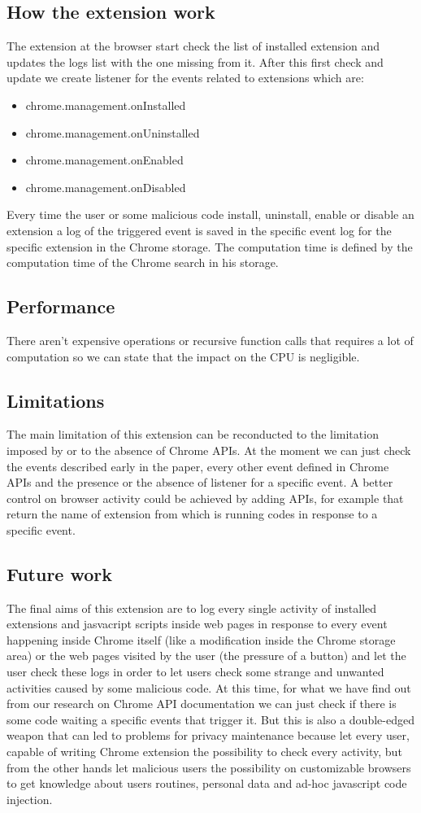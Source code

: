 \documentclass[12pt]{article}
\begin{document}
\begin{multicols}{2}
\subsection*{How the extension work}
The extension at the browser start check the list of installed extension and updates the logs list with the one missing from it.
After this first check and update we create listener for the events related to extensions which are: 
\begin{itemize}
	\item  chrome.management.onInstalled
	\item  chrome.management.onUninstalled
	\item  chrome.management.onEnabled
	\item  chrome.management.onDisabled
\end{itemize}
Every time the user or some malicious code install, uninstall, enable or disable an extension a log of the triggered event is saved in the specific event log for the specific extension in the Chrome storage.
The computation time is defined by the computation time of the Chrome search in his storage.
\subsection*{Performance}
There aren't expensive operations or recursive function calls that requires a lot of computation so we can state that the impact on the CPU is negligible.
\subsection*{Limitations}
The main limitation of this extension can be reconducted to the limitation imposed by or to the absence of Chrome APIs.
At the moment we can just check the events described early in the paper, every other event defined in Chrome APIs and the presence or the absence of listener for a specific event.
A better control on browser activity could be achieved by adding APIs, for example that return the name of extension from which is running codes in response to a specific event.
\subsection*{Future work}
The final aims of this extension are to log every single activity of installed extensions and jasvacript scripts inside web pages in response to every event happening inside Chrome itself (like a modification inside the Chrome storage area) or the web pages visited by the user (the pressure of a button) and let the user check these logs	in order to let users check some strange and unwanted activities caused by some malicious code. At this time, for what we have find out from our research on Chrome API documentation we can just check if there is some code waiting a specific events that trigger it.
But this is also a double-edged weapon that can led to problems for privacy maintenance because let every user, capable of writing Chrome extension the possibility to check every activity, but from the other hands let malicious users the possibility  on customizable browsers to get knowledge about users routines, personal data and ad-hoc javascript code injection.

\end{multicols}
\end{document}
